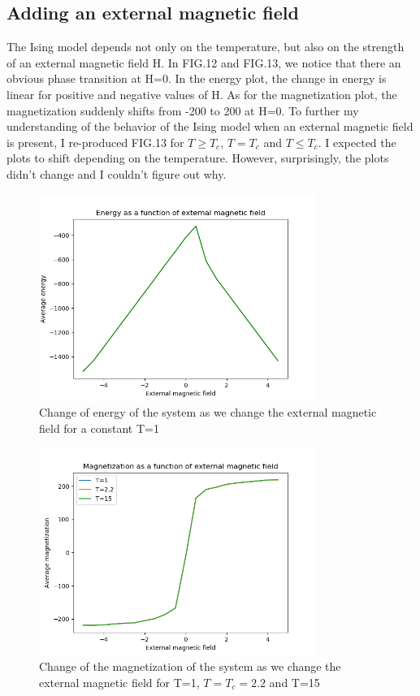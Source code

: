 \documentclass[aps,twocolumn,twoside,secnumarabic,balancelastpage,amsmath,amssymb,nofootinbib,hyperref=pdftex]{revtex4}
\begin{document}
\subsection{Adding an external magnetic field}
\par The Ising model depends not only on the temperature, but also on the strength of an external magnetic field H. In FIG.12 and FIG.13, we notice that there an obvious phase transition at H=0. In the energy plot, the change in energy is linear for positive and negative values of H. As for the magnetization plot, the magnetization suddenly shifts from -200 to 200 at H=0. To further my understanding of the behavior of the Ising model when an external magnetic field is present, I re-produced FIG.13 for $T \geqslant T_c$, $T=T_c$ and $T \leqslant T_c$. I expected the plots to shift depending on the temperature. However, surprisingly, the plots didn't change and I couldn't figure out why.
\begin{figure}[htb]
\includegraphics[width=9cm]{E_h.png}	
\caption{Change of energy of the system as we change the external magnetic field for a constant T=1}
\end{figure}

\begin{figure}[htb]
\includegraphics[width=9cm]{E_h_T.png}	
\caption{Change of the magnetization of the system as we change the external magnetic field for T=1, $T=T_c=2.2$ and T=15 }
\end{figure}
\end{document}
